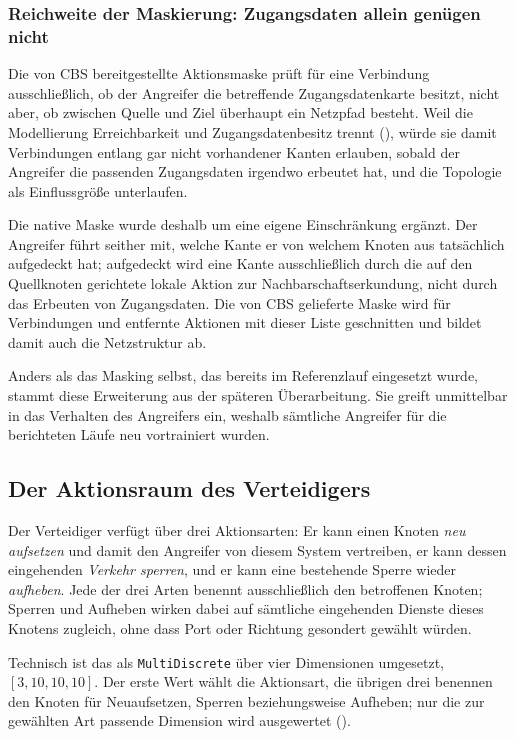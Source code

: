 \subsubsection{Reichweite der Maskierung: Zugangsdaten allein genügen nicht}
\label{sec:mask-reichweite}

Die von \ac{CBS} bereitgestellte Aktionsmaske prüft für eine Verbindung
ausschließlich, ob der Angreifer die betreffende Zugangsdatenkarte besitzt,
nicht aber, ob zwischen Quelle und Ziel überhaupt ein Netzpfad besteht.
Weil die Modellierung Erreichbarkeit und Zugangsdatenbesitz trennt
(), würde sie damit Verbindungen entlang gar nicht
vorhandener Kanten erlauben, sobald der Angreifer die passenden
Zugangsdaten irgendwo erbeutet hat, und die Topologie als Einflussgröße
unterlaufen.

Die native Maske wurde deshalb um eine eigene Einschränkung ergänzt. Der Angreifer führt seither mit, welche Kante er von welchem Knoten aus
tatsächlich aufgedeckt hat; aufgedeckt wird eine Kante ausschließlich durch
die auf den Quellknoten gerichtete lokale Aktion zur
Nachbarschaftserkundung, nicht durch das Erbeuten von Zugangsdaten. Die von
\ac{CBS} gelieferte Maske wird für Verbindungen und entfernte Aktionen mit
dieser Liste geschnitten und bildet damit auch die Netzstruktur ab.

Anders als das Masking selbst, das bereits im Referenzlauf eingesetzt wurde,
stammt diese Erweiterung aus der späteren Überarbeitung. Sie greift unmittelbar
in das Verhalten des Angreifers ein, weshalb sämtliche Angreifer für die
berichteten Läufe neu vortrainiert wurden.

\subsection{Der Aktionsraum des Verteidigers}
\label{sec:aktionsraum-def}

Der Verteidiger verfügt über drei Aktionsarten: Er kann einen Knoten \emph{neu
aufsetzen} und damit den Angreifer von diesem System vertreiben, er kann
dessen eingehenden \emph{Verkehr sperren}, und er kann eine bestehende Sperre
wieder \emph{aufheben}. Jede der drei Arten benennt ausschließlich den
betroffenen Knoten; Sperren und Aufheben wirken dabei auf sämtliche
eingehenden Dienste dieses Knotens zugleich, ohne dass Port oder Richtung
gesondert gewählt würden.

Technisch ist das als \texttt{MultiDiscrete} über vier Dimensionen umgesetzt,
$[3, 10, 10, 10]$. Der erste Wert wählt die Aktionsart, die übrigen drei
benennen den Knoten für Neuaufsetzen, Sperren beziehungsweise Aufheben; nur
die zur gewählten Art passende Dimension wird ausgewertet
().

